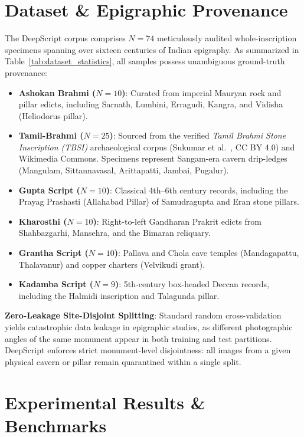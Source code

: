 \documentclass[conference,10pt]{IEEEtran}
\begin{document}
\section{Dataset & Epigraphic Provenance}



The DeepScript corpus comprises $N = 74$ meticulously audited whole-inscription specimens spanning over sixteen centuries of Indian epigraphy. As summarized in Table~\ref{tab:dataset_statistics}, all samples possess unambiguous ground-truth provenance:
\begin{itemize}
    \item \textbf{Ashokan Brahmi ($N=10$)}: Curated from imperial Mauryan rock and pillar edicts, including Sarnath, Lumbini, Erragudi, Kangra, and Vidisha (Heliodorus pillar).
    \item \textbf{Tamil-Brahmi ($N=25$)}: Sourced from the verified \textit{Tamil Brahmi Stone Inscription (TBSI)} archaeological corpus (Sukumar et al.~\cite{sukumar2024tbsi}, CC BY 4.0) and Wikimedia Commons. Specimens represent Sangam-era cavern drip-ledges (Mangulam, Sittannavasal, Arittapatti, Jambai, Pugalur).
    \item \textbf{Gupta Script ($N=10$)}: Classical 4th--6th century records, including the Prayag Prashasti (Allahabad Pillar) of Samudragupta and Eran stone pillars.
    \item \textbf{Kharosthi ($N=10$)}: Right-to-left Gandharan Prakrit edicts from Shahbazgarhi, Mansehra, and the Bimaran reliquary.
    \item \textbf{Grantha Script ($N=10$)}: Pallava and Chola cave temples (Mandagapattu, Thalavanur) and copper charters (Velvikudi grant).
    \item \textbf{Kadamba Script ($N=9$)}: 5th-century box-headed Deccan records, including the Halmidi inscription and Talagunda pillar.
\end{itemize}

\textbf{Zero-Leakage Site-Disjoint Splitting}: Standard random cross-validation yields catastrophic data leakage in epigraphic studies, as different photographic angles of the same monument appear in both training and test partitions. DeepScript enforces strict monument-level disjointness: all images from a given physical cavern or pillar remain quarantined within a single split.

\section{Experimental Results & Benchmarks}
\end{document}
